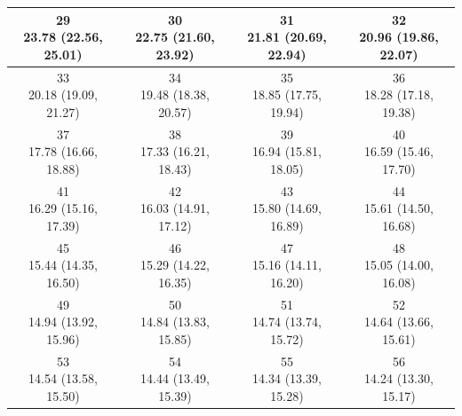 \begin{table}[htbp]
\begin{tabular}{cccc}
\hline
\shortstack[c]{29\\23.78 (22.56, 25.01)} & \shortstack[c]{30\\22.75 (21.60, 23.92)} & \shortstack[c]{31\\21.81 (20.69, 22.94)} & \shortstack[c]{32\\20.96 (19.86, 22.07)} \\
\hline
\shortstack[c]{33\\20.18 (19.09, 21.27)} & \shortstack[c]{34\\19.48 (18.38, 20.57)} & \shortstack[c]{35\\18.85 (17.75, 19.94)} & \shortstack[c]{36\\18.28 (17.18, 19.38)} \\
\hline
\shortstack[c]{37\\17.78 (16.66, 18.88)} & \shortstack[c]{38\\17.33 (16.21, 18.43)} & \shortstack[c]{39\\16.94 (15.81, 18.05)} & \shortstack[c]{40\\16.59 (15.46, 17.70)} \\
\hline
\shortstack[c]{41\\16.29 (15.16, 17.39)} & \shortstack[c]{42\\16.03 (14.91, 17.12)} & \shortstack[c]{43\\15.80 (14.69, 16.89)} & \shortstack[c]{44\\15.61 (14.50, 16.68)} \\
\hline
\shortstack[c]{45\\15.44 (14.35, 16.50)} & \shortstack[c]{46\\15.29 (14.22, 16.35)} & \shortstack[c]{47\\15.16 (14.11, 16.20)} & \shortstack[c]{48\\15.05 (14.00, 16.08)} \\
\hline
\shortstack[c]{49\\14.94 (13.92, 15.96)} & \shortstack[c]{50\\14.84 (13.83, 15.85)} & \shortstack[c]{51\\14.74 (13.74, 15.72)} & \shortstack[c]{52\\14.64 (13.66, 15.61)} \\
\hline
\shortstack[c]{53\\14.54 (13.58, 15.50)} & \shortstack[c]{54\\14.44 (13.49, 15.39)} & \shortstack[c]{55\\14.34 (13.39, 15.28)} & \shortstack[c]{56\\14.24 (13.30, 15.17)} \\

\end{tabular}
\end{table}
